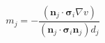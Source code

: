 $$
m_j = - \frac{\left(\mathbf n_j\cdot\boldsymbol\sigma_i\nabla v\right)}{\left(\mathbf n_j\cdot\boldsymbol\sigma_i\mathbf n_j\right) d_j}
$$
